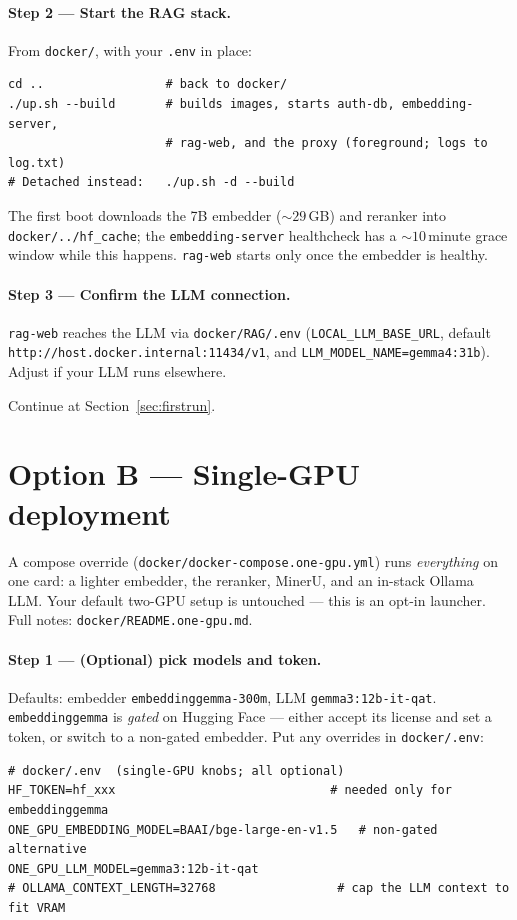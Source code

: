 \documentclass[11pt,a4paper]{article}
\newcommand{\code}[1]{\texttt{\small #1}}
\begin{document}
\paragraph{Step 2 --- Start the RAG stack.}
From \code{docker/}, with your \code{.env} in place:
\begin{lstlisting}
cd ..                 # back to docker/
./up.sh --build       # builds images, starts auth-db, embedding-server,
                      # rag-web, and the proxy (foreground; logs to log.txt)
# Detached instead:   ./up.sh -d --build
\end{lstlisting}
The first boot downloads the 7B embedder (${\sim}29$\,GB) and reranker into
\code{docker/../hf\_cache}; the \code{embedding-server} healthcheck has a
${\sim}10$\,minute grace window while this happens. \code{rag-web} starts only
once the embedder is healthy.

\paragraph{Step 3 --- Confirm the LLM connection.}
\code{rag-web} reaches the LLM via \code{docker/RAG/.env}
(\code{LOCAL\_LLM\_BASE\_URL}, default \code{http://host.docker.internal:11434/v1},
and \code{LLM\_MODEL\_NAME=gemma4:31b}). Adjust if your LLM runs elsewhere.

Continue at Section~\ref{sec:firstrun}.

\section{Option B --- Single-GPU deployment}\label{sec:onegpu}
A compose override (\code{docker/docker-compose.one-gpu.yml}) runs
\emph{everything} on one card: a lighter embedder, the reranker, MinerU, and an
in-stack Ollama LLM. Your default two-GPU setup is untouched --- this is an
opt-in launcher. Full notes: \code{docker/README.one-gpu.md}.

\paragraph{Step 1 --- (Optional) pick models and token.}
Defaults: embedder \code{embeddinggemma-300m}, LLM \code{gemma3:12b-it-qat}.
\code{embeddinggemma} is \emph{gated} on Hugging Face --- either accept its
license and set a token, or switch to a non-gated embedder. Put any overrides in
\code{docker/.env}:
\begin{lstlisting}
# docker/.env  (single-GPU knobs; all optional)
HF_TOKEN=hf_xxx                              # needed only for embeddinggemma
ONE_GPU_EMBEDDING_MODEL=BAAI/bge-large-en-v1.5   # non-gated alternative
ONE_GPU_LLM_MODEL=gemma3:12b-it-qat
# OLLAMA_CONTEXT_LENGTH=32768                 # cap the LLM context to fit VRAM
\end{lstlisting}
\end{document}
